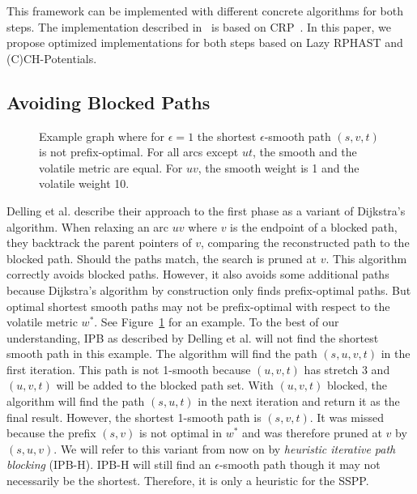 \documentclass[a4paper,UKenglish,cleveref, autoref, thm-restate]{lipics-v2021}
\begin{document}
This framework can be implemented with different concrete algorithms for both steps.
The implementation described in~\cite{dss-tarrn-18} is based on CRP~\cite{dgpw-crprn-13}.
In this paper, we propose optimized implementations for both steps based on Lazy RPHAST and (C)CH-Potentials.

\subsection{Avoiding Blocked Paths}\label{sec:ipb}

\begin{figure}
\centering
{}
\caption{Example graph where for $\epsilon = 1$ the shortest $\epsilon$-smooth path $(s,v,t)$ is not prefix-optimal. For all arcs except $ut$, the smooth and the volatile metric are equal. For $uv$, the smooth weight is 1 and the volatile weight 10.}
\label{fig:ipb_counterexample}
\end{figure}

Delling et al. describe their approach to the first phase as a variant of Dijkstra's algorithm.
When relaxing an arc $uv$ where $v$ is the endpoint of a blocked path, they backtrack the parent pointers of $v$, comparing the reconstructed path to the blocked path.
Should the paths match, the search is pruned at $v$.
This algorithm correctly avoids blocked paths.
However, it also avoids some additional paths because Dijkstra's algorithm by construction only finds prefix-optimal paths.
But optimal shortest smooth paths may not be prefix-optimal with respect to the volatile metric $w^*$.
See Figure~\ref{fig:ipb_counterexample} for an example.
To the best of our understanding, IPB as described by Delling et al. will not find the shortest smooth path in this example.
The algorithm will find the path $(s,u,v,t)$ in the first iteration.
This path is not 1-smooth because $(u,v,t)$ has stretch 3 and $(u,v,t)$ will be added to the blocked path set.
With $(u,v,t)$ blocked, the algorithm will find the path $(s,u,t)$ in the next iteration and return it as the final result.
However, the shortest 1-smooth path is $(s,v,t)$.
It was missed because the prefix $(s,v)$ is not optimal in $w^*$ and was therefore pruned at $v$ by $(s,u,v)$.
We will refer to this variant from now on by \emph{heuristic iterative path blocking} (IPB-H).
IPB-H will still find an $\epsilon$-smooth path though it may not necessarily be the shortest.
Therefore, it is only a heuristic for the SSPP.
\end{document}
